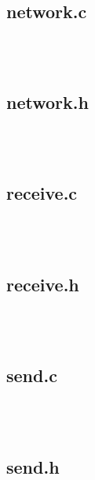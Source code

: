 \documentclass{article}
\begin{document}
\begin{verbatim}



\end{verbatim}

\subsection*{network.c}

\begin{verbatim}



\end{verbatim}

\subsection*{network.h}

\begin{verbatim}



\end{verbatim}

\subsection*{receive.c}

\begin{verbatim}



\end{verbatim}

\subsection*{receive.h}

\begin{verbatim}



\end{verbatim}

\subsection*{send.c}

\begin{verbatim}



\end{verbatim}

\subsection*{send.h}
\end{document}
